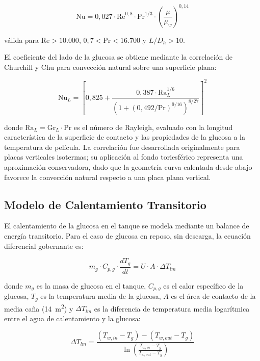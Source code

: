 \begin{equation}
\text{Nu} = 0,027 \cdot \text{Re}^{0,8} \cdot \text{Pr}^{1/3} \cdot \left(\frac{\mu}{\mu_w}\right)^{0,14}
\label{eq:sieder_tate}
\end{equation}

v\'alida para $\text{Re} > 10{.}000$, $0,7 < \text{Pr} < 16{.}700$ y $L/D_h > 10$.

El coeficiente del lado de la glucosa se obtiene mediante la correlaci\'on de Churchill y Chu para convecci\'on natural sobre una superficie plana:

\begin{equation}
\text{Nu}_L = \left[0,825 + \frac{0,387 \cdot \text{Ra}_L^{1/6}}{\left(1 + (0,492/\text{Pr})^{9/16}\right)^{8/27}}\right]^2
\label{eq:churchill_chu}
\end{equation}

donde $\text{Ra}_L = \text{Gr}_L \cdot \text{Pr}$ es el n\'umero de Rayleigh, evaluado con la longitud caracter\'istica de la superficie de contacto y las propiedades de la glucosa a la temperatura de pel\'icula. La correlaci\'on fue desarrollada originalmente para placas verticales isotermas; su aplicaci\'on al fondo toriesf\'erico representa una aproximaci\'on conservadora, dado que la geometr\'ia curva calentada desde abajo favorece la convecci\'on natural respecto a una placa plana vertical.

\subsection{Modelo de Calentamiento Transitorio}

El calentamiento de la glucosa en el tanque se modela mediante un balance de energ\'ia transitorio. Para el caso de glucosa en reposo, sin descarga, la ecuaci\'on diferencial gobernante es:

\begin{equation}
m_{g} \cdot C_{p,g} \cdot \frac{dT_g}{dt} = U \cdot A \cdot \Delta T_{lm}
\label{eq:balance_transitorio}
\end{equation}

donde $m_g$ es la masa de glucosa en el tanque, $C_{p,g}$ es el calor espec\'ifico de la glucosa, $T_g$ es la temperatura media de la glucosa, $A$ es el \'area de contacto de la media ca\~na (14~m\textsuperscript{2}) y $\Delta T_{lm}$ es la diferencia de temperatura media logar\'itmica entre el agua de calentamiento y la glucosa:

\begin{equation}
\Delta T_{lm} = \frac{(T_{w,in} - T_g) - (T_{w,out} - T_g)}{\ln\left(\frac{T_{w,in} - T_g}{T_{w,out} - T_g}\right)}
\label{eq:LMTD}
\end{equation}

